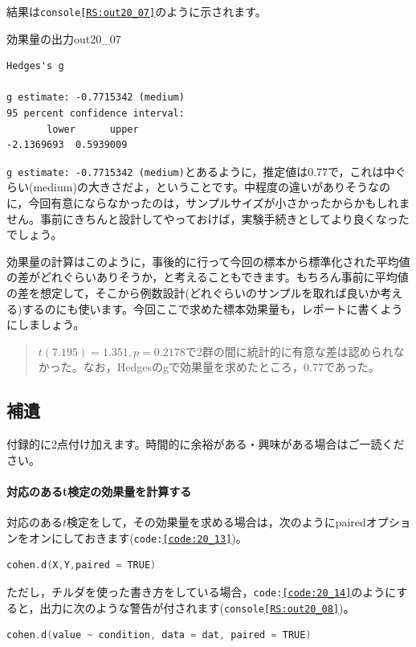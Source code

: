 \documentclass{ltjsbook}
\begin{document}
結果は\texttt{console\ref{RS:out20_07}}のように示されます。
\begin{Rscreen}{効果量の出力}{out20_07}
	\begin{verbatim}
Hedges's g

g estimate: -0.7715342 (medium)
95 percent confidence interval:
       lower      upper 
-2.1369693  0.5939009 
\end{verbatim}
\end{Rscreen}

\texttt{g estimate: -0.7715342 (medium)}とあるように，推定値は0.77で，これは中ぐらい(medium)の大きさだよ，ということです。中程度の違いがありそうなのに，今回有意にならなかったのは，サンプルサイズが小さかったからかもしれません。事前にきちんと設計してやっておけば，実験手続きとしてより良くなったでしょう。

効果量の計算はこのように，事後的に行って今回の標本から標準化された平均値の差がどれぐらいありそうか，と考えることもできます。もちろん事前に平均値の差を想定して，そこから例数設計(どれぐらいのサンプルを取れば良いか考える)するのにも使います。今回ここで求めた標本効果量も，レポートに書くようにしましょう。

\begin{quote}
	$t(7.195)=1.351,p = 0.2178$で2群の間に統計的に有意な差は認められなかった。なお，Hedgesのgで効果量を求めたところ，0.77であった。
\end{quote}

\subsection{補遺}
付録的に2点付け加えます。時間的に余裕がある・興味がある場合はご一読ください。
\paragraph{対応のあるt検定の効果量を計算する}対応のある$t$検定をして，その効果量を求める場合は，次のようにpairedオプションをオンにしておきます(\texttt{code:\ref{code:20_13}})。

\begin{lstlisting}[language=c++,label={code:20_13},caption={cohenのd}]
cohen.d(X,Y,paired = TRUE)
\end{lstlisting}
ただし，チルダを使った書き方をしている場合，\texttt{code:\ref{code:20_14}}のようにすると，出力に次のような警告が付されます(\texttt{console\ref{RS:out20_08}})。
\begin{lstlisting}[language=c++,label={code:20_14},caption={cohenのdその2}]
cohen.d(value ~ condition, data = dat, paired = TRUE)
\end{lstlisting}
\end{document}
